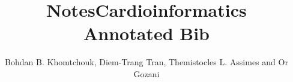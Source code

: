 \documentclass[11pt,legalpaper]{article}
\title{Notes}
\begin{document}
\setcounter{secnumdepth}{0}
\title{Cardioinformatics\\
Annotated Bib}
\author{Bohdan B. Khomtchouk, Diem-Trang Tran, Themistocles L. Assimes and Or Gozani}

\maketitle
\nocite{*}


\end{document}
